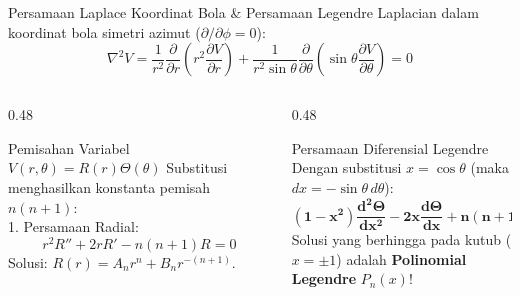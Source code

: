 \documentclass[aspectratio=169,10pt]{beamer}
\begin{document}
\begin{frame}{Persamaan Laplace Koordinat Bola \& Persamaan Legendre}
  Laplacian dalam koordinat bola simetri azimut ($\partial/\partial \phi = 0$):
  \begin{equation*}
    \nabla^2 V = \frac{1}{r^2}\frac{\partial}{\partial r}\left(r^2 \frac{\partial V}{\partial r}\right) + \frac{1}{r^2 \sin\theta}\frac{\partial}{\partial \theta}\left(\sin\theta \frac{\partial V}{\partial \theta}\right) = 0
  \end{equation*}
  \vspace{-0.1cm}
  \begin{columns}[t]
    \begin{column}{0.48\textwidth}
      \begin{block}{Pemisahan Variabel $V(r, \theta) = R(r)\Theta(\theta)$}
        \small
        Substitusi menghasilkan konstanta pemisah $n(n+1)$:\\
        1. Persamaan Radial:
        \begin{equation*}
          r^2 R'' + 2r R' - n(n+1)R = 0
        \end{equation*}
        Solusi: $R(r) = A_n r^n + B_n r^{-(n+1)}$.
      \end{block}
    \end{column}
    \begin{column}{0.48\textwidth}
      \begin{alertblock}{Persamaan Diferensial Legendre}
        \small
        Dengan substitusi $x = \cos\theta$ (maka $dx = -\sin\theta\,d\theta$):
        \begin{equation*}
          \mathbf{(1 - x^2)\frac{d^2 \Theta}{dx^2} - 2x \frac{d\Theta}{dx} + n(n+1)\Theta = 0}
        \end{equation*}
        Solusi yang berhingga pada kutub ($x = \pm 1$) adalah \textbf{Polinomial Legendre} $P_n(x)$!
      \end{alertblock}
    \end{column}
  \end{columns}
\end{frame}
\end{document}
